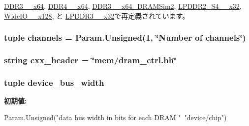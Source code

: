 \hyperlink{classDRAMCtrl_1_1DDR3__1600__x64_afeba385888f1ce3063d25f20c0e7a89b}{DDR3\_\_\-x64}, \hyperlink{classDRAMCtrl_1_1DDR4__2400__x64_afeba385888f1ce3063d25f20c0e7a89b}{DDR4\_\_\-x64}, \hyperlink{classDRAMCtrl_1_1DDR3__1333__x64__DRAMSim2_afeba385888f1ce3063d25f20c0e7a89b}{DDR3\_\_\-x64\_\-DRAMSim2}, \hyperlink{classDRAMCtrl_1_1LPDDR2__S4__1066__x32_afeba385888f1ce3063d25f20c0e7a89b}{LPDDR2\_\-S4\_\_\-x32}, \hyperlink{classDRAMCtrl_1_1WideIO__200__x128_afeba385888f1ce3063d25f20c0e7a89b}{WideIO\_\_\-x128}, と \hyperlink{classDRAMCtrl_1_1LPDDR3__1600__x32_afeba385888f1ce3063d25f20c0e7a89b}{LPDDR3\_\_\-x32}で再定義されています。\hypertarget{classDRAMCtrl_1_1DRAMCtrl_af713f23641a8e59f46aeedcb92721b7f}{
\subsubsection[{channels}]{\setlength{\rightskip}{0pt plus 5cm}tuple {\bf channels} = Param.Unsigned(1, \char`\"{}Number of {\bf channels}\char`\"{})}}
\label{classDRAMCtrl_1_1DRAMCtrl_af713f23641a8e59f46aeedcb92721b7f}
\hypertarget{classDRAMCtrl_1_1DRAMCtrl_a17da7064bc5c518791f0c891eff05fda}{
\subsubsection[{cxx\_\-header}]{\setlength{\rightskip}{0pt plus 5cm}string {\bf cxx\_\-header} = \char`\"{}mem/dram\_\-ctrl.hh\char`\"{}}}
\label{classDRAMCtrl_1_1DRAMCtrl_a17da7064bc5c518791f0c891eff05fda}
\hypertarget{classDRAMCtrl_1_1DRAMCtrl_a07485b73205fce4f544f48a9debd611f}{
\subsubsection[{device\_\-bus\_\-width}]{\setlength{\rightskip}{0pt plus 5cm}tuple {\bf device\_\-bus\_\-width}}}
\label{classDRAMCtrl_1_1DRAMCtrl_a07485b73205fce4f544f48a9debd611f}
{\bfseries 初期値:}
\begin{DoxyCode}
Param.Unsigned("data bus width in bits for each DRAM "\
                                      "device/chip")
\end{DoxyCode}


